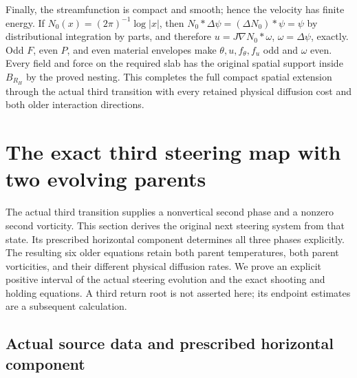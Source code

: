 Finally, the streamfunction is compact and smooth; hence the velocity
has finite energy. If $N_0(x)=(2\pi)^{-1}\log|x|$, then
$N_0*\Delta\psi=(\Delta N_0)*\psi=\psi$ by distributional
integration by parts, and therefore
$u=J\nabla N_0*\omega$, $\omega=\Delta\psi$, exactly.
Odd $F$, even $P$, and even material envelopes make
$\theta,u,f_\theta,f_u$ odd and $\omega$ even. Every field and
force on the required slab has the original spatial support inside
$B_{R_H}$ by the proved nesting. This completes the full compact
spatial extension through the actual third transition with every
retained physical diffusion cost and both older interaction directions.


\section{The exact third steering map with two evolving parents}
\label{cvlane:tr:section}

The actual third transition supplies a nonvertical second phase and
a nonzero second vorticity. This section derives the original next
steering system from that state. Its prescribed horizontal component
determines all three phases explicitly. The resulting six older
equations retain both parent temperatures, both parent vorticities,
and their different physical diffusion rates. We prove an explicit
positive interval of the actual steering evolution and the exact
shooting and holding equations. A third return root is not asserted
here; its endpoint estimates are a subsequent calculation.

\subsection{Actual source data and prescribed horizontal component}

